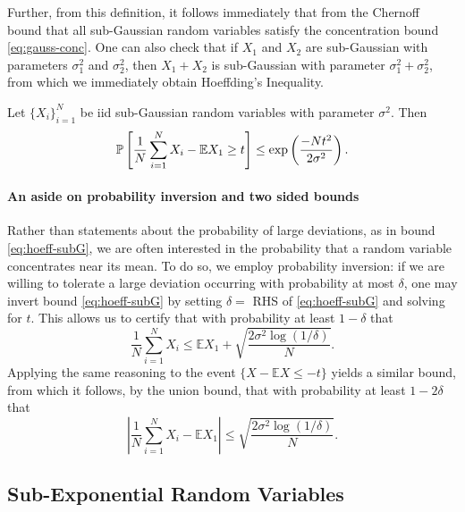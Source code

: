 \documentclass{article}[12pt]
\def\E{\mathbb{E}}
\def \E{\mathbb E}
\begin{document}
Further, from this definition, it follows immediately that from the Chernoff bound that all sub-Gaussian random variables satisfy the concentration bound \eqref{eq:gauss-conc}.  One can also check that if $X_1$ and $X_2$ are sub-Gaussian with parameters $\sigma_1^2$ and $\sigma_2^2$, then $X_1 + X_2$ is sub-Gaussian with parameter $\sigma_1^2 + \sigma_2^2$, from which we immediately obtain Hoeffding's Inequality.
 
 
 \begin{theorem}
Let $\{X_i\}_{i=1}^N$ be iid sub-Gaussian random variables with parameter $\sigma^2$.  Then
\begin{equation}
\Prob{\frac{1}{N}\sum_{i=1}^N X_i - \E X_1 \geq t} \leq \exp{\frac{-Nt^2}{2\sigma^2}}.
\label{eq:hoeff-subG}
\end{equation}
\label{thm:Hoeffding-subG}
\end{theorem}
 
 
 \paragraph*{An aside on probability inversion and two sided bounds}  Rather than statements about the probability of large deviations, as in bound \eqref{eq:hoeff-subG}, we are often interested in the probability that a random variable concentrates near its mean.  To do so, we employ probability inversion:  if we are willing to tolerate a large deviation occurring with probability at most $\delta$, one may invert bound \eqref{eq:hoeff-subG} by setting $\delta = $ RHS of \eqref{eq:hoeff-subG} and solving for $t$.  This allows us to certify that with probability at least $1-\delta$ that
\begin{equation}
\frac{1}{N}\sum_{i=1}^N X_i \leq  \E X_1 + \sqrt{\frac{2\sigma^2\log(1/\delta)}{N}}.
\end{equation}
Applying the same reasoning to the event $\{X - \E X \leq -t\}$ yields a similar bound, from which it follows, by the union bound, that with probability at least $1-2\delta$ that 
\begin{equation}
\left|\frac{1}{N}\sum_{i=1}^N X_i - \E X_1 \right|\leq \sqrt{\frac{2\sigma^2\log(1/\delta)}{N}}.
\label{eq:two-sided-bound}
\end{equation}
 
 \subsection{Sub-Exponential Random Variables}
 
\end{document}
